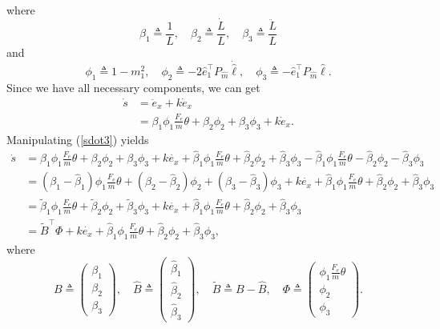 where
\begin{equation}
\beta_1 \triangleq \frac{1}{L},\quad \beta_2 \triangleq \frac{\dot{L}}{L}, \quad \beta_3 \triangleq \frac{\ddot{L}}{L}
\end{equation}
and
\begin{equation}
\phi_1 \triangleq 1-m_1^2,\quad \phi_2 \triangleq -2\hat{e}_1^{\top}P_{\hat{m}}\dot{\hat{\ell}}, \quad \phi_3 \triangleq -\hat{e}_1^{\top}P_{\hat{m}}\hat{\ell}.
\end{equation}
Since we have all necessary components, we can get 
\begin{align}
\dot{s}&=\ddot{e}_x+k\dot{e}_x
\\&=\beta_1\phi_1\frac{F_e}{m}\theta+\beta_2\phi_2+\beta_3\phi_3+k\dot{e}_x.
\label{sdot3}
\end{align}
Manipulating (\ref{sdot3}) yields
\begin{align}
\dot{s}&=\beta_1\phi_1\frac{F_e}{m}\theta+\beta_2\phi_2+\beta_3\phi_3+k\dot{e_x}+\hat{\beta}_1\phi_1\frac{F_e}{m}\theta+\hat{\beta}_2\phi_2+\hat{\beta}_3\phi_3-\hat{\beta}_1\phi_1\frac{F_e}{m}\theta-\hat{\beta}_2\phi_2-\hat{\beta}_3\phi_3
\\&=(\beta_1-\hat{\beta}_1)\phi_1\frac{F_e}{m}\theta+(\beta_2-\hat{\beta}_2)\phi_2+(\beta_3-\hat{\beta}_3)\phi_3+k\dot{e_x}+\hat{\beta}_1\phi_1\frac{F_e}{m}\theta+\hat{\beta}_2\phi_2+\hat{\beta}_3\phi_3
\\&=\tilde{\beta}_1\phi_1\frac{F_e}{m}\theta+\tilde{\beta}_2\phi_2+\tilde{\beta}_3\phi_3+k\dot{e_x}+\hat{\beta}_1\phi_1\frac{F_e}{m}\theta+\hat{\beta}_2\phi_2+\hat{\beta}_3\phi_3
\\&=\tilde{B}^\top\Phi+k\dot{e_x}+\hat{\beta}_1\phi_1\frac{F_e}{m}\theta+\hat{\beta}_2\phi_2+\hat{\beta}_3\phi_3,
\end{align}
where 
\begin{equation}
B \triangleq \begin{pmatrix}
\beta_1 \\ \beta_2 \\ \beta_3
\end{pmatrix}, \quad
\hat{B} \triangleq \begin{pmatrix} \hat{\beta}_1 \\ \hat{\beta}_2 \\ \hat{\beta}_3 \end{pmatrix}, \quad
\tilde{B} \triangleq B-\hat{B}, \quad 
\Phi \triangleq \begin{pmatrix} \phi_1\frac{F_e}{m}\theta \\ \phi_2 \\ \phi_3 \end{pmatrix}.
\end{equation}
